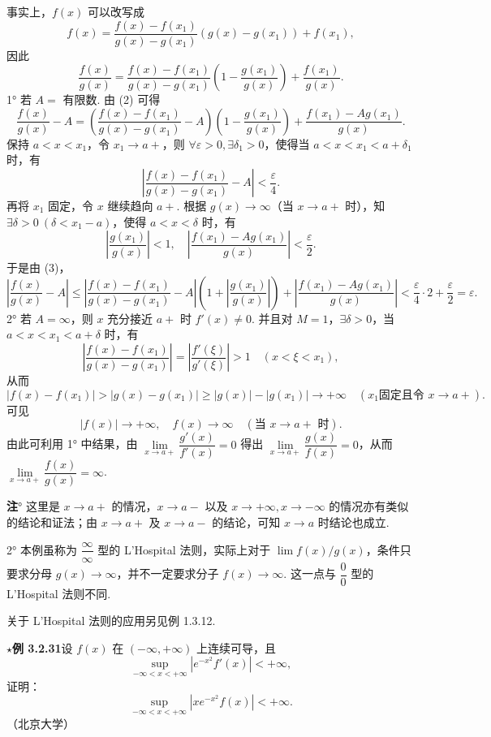 \documentclass[UTF8,12pt,a4paper,fontset=fandol]{ctexart}
\begin{document}
事实上，$f(x)$ 可以改写成
\[
  f(x)=\frac{f(x)-f(x_1)}{g(x)-g(x_1)}(g(x)-g(x_1))+f(x_1),
\]
因此
\begin{equation}
  \frac{f(x)}{g(x)}
  =
  \frac{f(x)-f(x_1)}{g(x)-g(x_1)}
  \left(1-\frac{g(x_1)}{g(x)}\right)
  +\frac{f(x_1)}{g(x)}.
\tag{2}
\end{equation}
1° 若 $A=$ 有限数. 由 (2) 可得
\begin{equation}
  \frac{f(x)}{g(x)}-A
  =
  \left(\frac{f(x)-f(x_1)}{g(x)-g(x_1)}-A\right)
  \left(1-\frac{g(x_1)}{g(x)}\right)
  +\frac{f(x_1)-Ag(x_1)}{g(x)}.
\tag{3}
\end{equation}
保持 $a<x<x_1$，令 $x_1\to a+$，则 $\forall\varepsilon>0,\exists\delta_1>0$，使得当 $a<x<x_1<a+\delta_1$ 时，有
\[
  \left|\frac{f(x)-f(x_1)}{g(x)-g(x_1)}-A\right|<\frac{\varepsilon}{4}.
\]
再将 $x_1$ 固定，令 $x$ 继续趋向 $a+$. 根据 $g(x)\to\infty$（当 $x\to a+$ 时），知 $\exists\delta>0\ (\delta<x_1-a)$，使得 $a<x<\delta$ 时，有
\[
  \left|\frac{g(x_1)}{g(x)}\right|<1,\quad
  \left|\frac{f(x_1)-Ag(x_1)}{g(x)}\right|<\frac{\varepsilon}{2}.
\]
于是由 (3)，
\[
  \left|\frac{f(x)}{g(x)}-A\right|
  \le
  \left|\frac{f(x)-f(x_1)}{g(x)-g(x_1)}-A\right|
  \left(1+\left|\frac{g(x_1)}{g(x)}\right|\right)
  +\left|\frac{f(x_1)-Ag(x_1)}{g(x)}\right|
  <\frac{\varepsilon}{4}\cdot2+\frac{\varepsilon}{2}=\varepsilon.
\]
2° 若 $A=\infty$，则 $x$ 充分接近 $a+$ 时 $f'(x)\ne0$. 并且对 $M=1$，$\exists\delta>0$，当 $a<x<x_1<a+\delta$ 时，有
\[
  \left|\frac{f(x)-f(x_1)}{g(x)-g(x_1)}\right|
  =
  \left|\frac{f'(\xi)}{g'(\xi)}\right|>1
  \quad(x<\xi<x_1),
\]
从而
\[
  |f(x)-f(x_1)|>|g(x)-g(x_1)|\ge |g(x)|-|g(x_1)|\to+\infty
  \quad(x_1\text{固定且令 }x\to a+).
\]
可见
\[
  |f(x)|\to+\infty,\quad f(x)\to\infty\quad(\text{当 }x\to a+\text{ 时}).
\]
由此可利用 1° 中结果，由 $\lim\limits_{x\to a+}\dfrac{g'(x)}{f'(x)}=0$ 得出 $\lim\limits_{x\to a+}\dfrac{g(x)}{f(x)}=0$，从而 $\lim\limits_{x\to a+}\dfrac{f(x)}{g(x)}=\infty$.

\noindent\textbf{注}° 这里是 $x\to a+$ 的情况，$x\to a-$ 以及 $x\to+\infty,x\to-\infty$ 的情况亦有类似的结论和证法；由 $x\to a+$ 及 $x\to a-$ 的结论，可知 $x\to a$ 时结论也成立.

2° 本例虽称为 $\dfrac{\infty}{\infty}$ 型的 L'Hospital 法则，实际上对于 $\lim f(x)/g(x)$，条件只要求分母 $g(x)\to\infty$，并不一定要求分子 $f(x)\to\infty$. 这一点与 $\dfrac{0}{0}$ 型的 L'Hospital 法则不同.

关于 L'Hospital 法则的应用另见例 1.3.12.

\noindent\textbf{$\star$例 3.2.31}\quad 设 $f(x)$ 在 $(-\infty,+\infty)$ 上连续可导，且
\[
  \sup_{-\infty<x<+\infty}|e^{-x^2}f'(x)|<+\infty,
\]
证明：
\[
  \sup_{-\infty<x<+\infty}|xe^{-x^2}f(x)|<+\infty.
\]
（北京大学）
\end{document}
